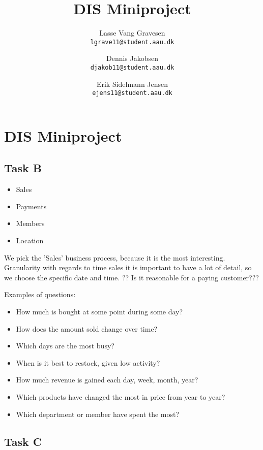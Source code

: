 

\author{
  Lasse Vang Gravesen\\
  \texttt{lgrave11@student.aau.dk}
  \and
  Dennis Jakobsen\\
  \texttt{djakob11@student.aau.dk}
  \and
  Erik Sidelmann Jensen\\
  \texttt{ejens11@student.aau.dk}
}

\title{DIS Miniproject}
\date{}


	\clearpage\maketitle
	\thispagestyle{empty}
	
	\chapter{DIS Miniproject}
	\section{Task B}
	\begin{itemize}
	\item Sales
	\item Payments
	\item Members
	\item Location
	\end{itemize}
	
	We pick the 'Sales' business process, because it is the most interesting. Granularity with regards to time sales it is important to have a lot of detail, so we choose the specific date and time. ?? Is it reasonable for a paying customer???  
	
	Examples of questions:
	\begin{itemize}
	\item How much is bought at some point during some day?
	\item How does the amount sold change over time?
	\item Which days are the most busy?
	\item When is it best to restock, given low activity?
	\item How much revenue is gained each day, week, month, year?
	\item Which products have changed the most in price from year to year?
	\item Which department or member have spent the most?
	\end{itemize}


	\section{Task C}
	


